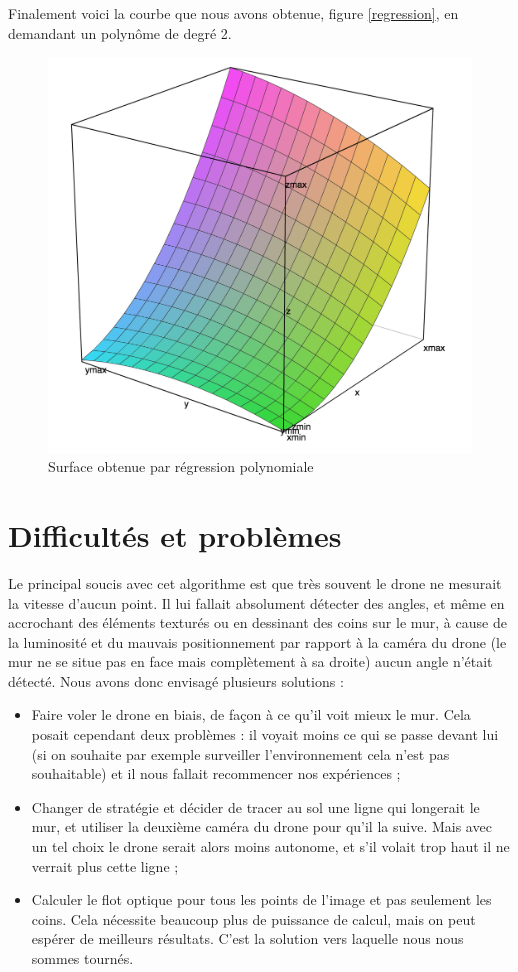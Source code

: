 \documentclass[titlepage,11pt,a4paper]{article}
\begin{document}
Finalement voici la courbe que nous avons obtenue, figure \vref{regression}, en demandant un polynôme de degré 2.

\begin{figure}
	\caption{\label{regression} Surface obtenue par régression polynomiale}
	\includegraphics[scale=0.8]{images/surface-regression.png}
\end{figure}


\section{Difficultés et problèmes}
Le principal soucis avec cet algorithme est que très souvent le drone ne mesurait la vitesse d'aucun point. Il lui fallait absolument détecter des angles, et même en accrochant des éléments texturés ou en dessinant des coins sur le mur, à cause de la luminosité et du mauvais positionnement par rapport à la caméra du drone (le mur ne se situe pas en face mais complètement à sa droite) aucun angle n'était détecté. Nous avons donc envisagé plusieurs solutions :
\begin{itemize}
	\item Faire voler le drone en biais, de façon à ce qu'il voit mieux le mur. Cela posait cependant deux problèmes : il voyait moins ce qui se passe devant lui (si on souhaite par exemple surveiller l'environnement cela n'est pas souhaitable) et il nous fallait recommencer nos expériences ;
	\item Changer de stratégie et décider de tracer au sol une ligne qui longerait le mur, et utiliser la deuxième caméra du drone pour qu'il la suive. Mais avec un tel choix le drone serait alors moins autonome, et s'il volait trop haut il ne verrait plus cette ligne ;
	\item Calculer le flot optique pour tous les points de l'image et pas seulement les coins. Cela nécessite beaucoup plus de puissance de calcul, mais on peut espérer de meilleurs résultats. C'est la solution vers laquelle nous nous sommes tournés.
\end{itemize}
\end{document}
